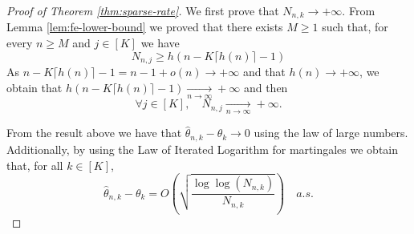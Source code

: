 \begin{proof}[Proof of Theorem \ref{thm:sparse-rate}]
%		
	We first prove that \(N_{n,k} \to +\infty\). {\color{revisiongreen} From Lemma \ref{lem:fe-lower-bound} we proved that there exists \(M\geq 1\) such that, for every \(n \geq M\) and \(j \in [K]\) we have
		\[
		N_{n,j}\ge h\!\left(n-K\lceil h(n)\rceil-1\right)
		\]
		As \(n-K\lceil h(n)\rceil-1 = n-1 +o(n) \to +\infty\) and that \(h\!\left(n\right) \to +\infty\), we obtain that \(h\!\left(n-K\lceil h(n)\rceil-1\right)\xrightarrow[n\to\infty]{}+\infty\) and then
		\[
		\forall j \in [K], \quad N_{n,j} \xrightarrow[n\to\infty]{} +\infty.
		\]}
	
		
	From the result above we have that \(\hat{\theta}_{n,k}-\theta_k \to 0\) using the law of large numbers. Additionally, by using the Law of Iterated Logarithm for martingales we obtain that, for all \(k \in [K]\),
	{\color{revisiongreen} \[\hat{\theta}_{n,k} - \theta_k = O\left(\sqrt{\frac{\log\log(N_{n,k})}{N_{n,k}}}\right) \quad a.s.\]}
	

\end{proof}
